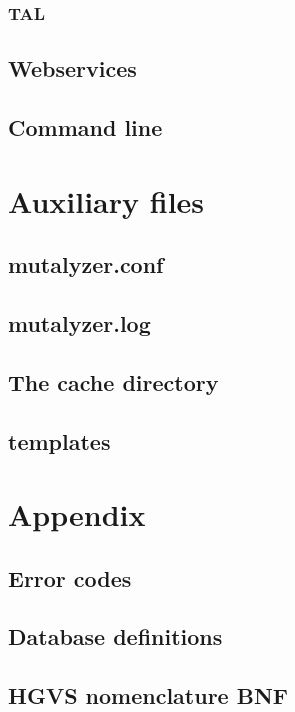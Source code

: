 \documentclass{article}
\begin{document}
\subsubsection{TAL} \label{subsubsec:templates}

\subsection{Webservices} \label{subsec:webservinterface}

\subsection{Command line} \label{subsec:commandline}

\newpage

\section{Auxiliary files}

\subsection{mutalyzer.conf}

\subsection{mutalyzer.log}

\subsection{The cache directory}

\subsection{templates}

\newpage

\appendix

\section{Appendix}

\subsection{Error codes} \label{subsec:error}


\subsection{Database definitions} \label{subsec:dbtables}


\subsection{HGVS nomenclature BNF} \label{subsec:bnf}


\newpage

{}

\end{document}
